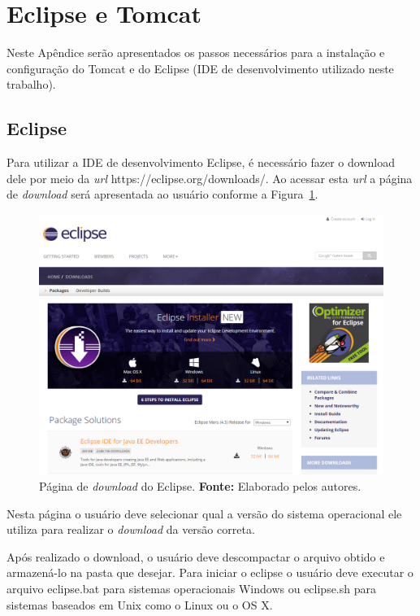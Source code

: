 \chapter*{Eclipse e Tomcat}
\label{apendice:2}

Neste Apêndice serão apresentados os passos necessários para a instalação e configuração do Tomcat e do Eclipse (IDE de desenvolvimento utilizado neste trabalho).

\section*{Eclipse}

Para utilizar a IDE de desenvolvimento Eclipse, é necessário fazer o download dele por meio da \textit{url} https://eclipse.org/downloads/. Ao acessar esta \textit{url} a página de \textit{download} será apresentada ao usuário conforme a Figura~\ref{fig:ap2:pagina_download_eclipse}.

\captionsetup[figure]{list=no}
\begin{figure}[h!]
	\centerline{\includegraphics[scale=0.4]{./imagens/apendices/pagina-download-eclipse.png}}
	\caption[Página de \textit{download} do Eclipse.]
	{Página de \textit{download} do Eclipse. \textbf{Fonte:} Elaborado pelos autores.}
	\label{fig:ap2:pagina_download_eclipse}
\end{figure}

Nesta página o usuário deve selecionar qual a versão do sistema operacional ele utiliza para realizar o \textit{download} da versão correta.

Após realizado o download, o usuário deve descompactar o arquivo obtido e armazená-lo na pasta que desejar. Para iniciar o eclipse o usuário deve executar o arquivo eclipse.bat para sistemas operacionais Windows ou eclipse.sh para sistemas baseados em Unix como o Linux ou o OS X.

